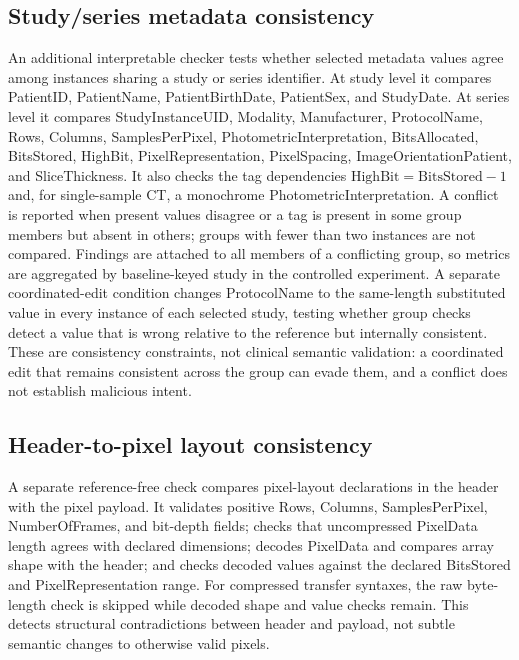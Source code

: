 \documentclass[journal]{IEEEtran}
\begin{document}
  \subsection{Study/series metadata consistency}
  An additional interpretable checker tests whether selected metadata values agree among instances sharing a study or series identifier. At study level it compares PatientID, PatientName, PatientBirthDate, PatientSex, and StudyDate. At series level it compares StudyInstanceUID, Modality, Manufacturer, ProtocolName, Rows, Columns, SamplesPerPixel, PhotometricInterpretation, BitsAllocated, BitsStored, HighBit, PixelRepresentation, PixelSpacing, ImageOrientationPatient, and SliceThickness. It also checks the tag dependencies $\mathrm{HighBit}=\mathrm{BitsStored}-1$ and, for single-sample CT, a monochrome PhotometricInterpretation. A conflict is reported when present values disagree or a tag is present in some group members but absent in others; groups with fewer than two instances are not compared. Findings are attached to all members of a conflicting group, so metrics are aggregated by baseline-keyed study in the controlled experiment. A separate coordinated-edit condition changes ProtocolName to the same-length substituted value in every instance of each selected study, testing whether group checks detect a value that is wrong relative to the reference but internally consistent. These are consistency constraints, not clinical semantic validation: a coordinated edit that remains consistent across the group can evade them, and a conflict does not establish malicious intent.
  
  \subsection{Header-to-pixel layout consistency}
  A separate reference-free check compares pixel-layout declarations in the header with the pixel payload. It validates positive Rows, Columns, SamplesPerPixel, NumberOfFrames, and bit-depth fields; checks that uncompressed PixelData length agrees with declared dimensions; decodes PixelData and compares array shape with the header; and checks decoded values against the declared BitsStored and PixelRepresentation range. For compressed transfer syntaxes, the raw byte-length check is skipped while decoded shape and value checks remain. This detects structural contradictions between header and payload, not subtle semantic changes to otherwise valid pixels.
  
\end{document}

